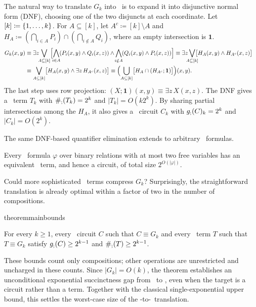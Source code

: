 The natural way to translate $G_k$ into \CoR\ is to expand it into disjunctive normal form (DNF),
choosing one of the two disjuncts at each coordinate.
Let $[k]\coloneqq\{ 1,\ldots,k \}$.
For $A\subseteq[k]$, let $A^c \coloneqq [k]\setminus A$ and
$H_A \coloneqq (\bigcap_{i\in A}P_i)\cap(\bigcap_{i\notin A}Q_i)$,
where an empty intersection is $\mathbf{1}$.
\begin{align*}
G_k(x,y)
&\equiv \exists z\!\!\bigvee_{A\subseteq[k]}
\Bigl[
\bigwedge_{\mathclap{i\in A}}(P_i(x,y)\land Q_i(x,z))
\land
\bigwedge_{\mathclap{i\notin A}}(Q_i(x,y)\land P_i(x,z))
\Bigr]
\equiv \exists z\bigvee_{\mathclap{A\subseteq[k]}}
\bigl[H_A(x,y)\land H_{A^c}(x,z)\bigr]
\\
&\equiv \bigvee_{A\subseteq[k]}
\bigl[H_A(x,y)\land\exists z\,H_{A^c}(x,z)\bigr]
\equiv \Bigl(\bigcup_{A\subseteq[k]}
\bigl[H_A\cap(H_{A^c};\mathbf{1})\bigr]\Bigr)(x,y).
\end{align*}
The last step uses row projection:
$(X;\mathbf{1})(x,y)\equiv\exists z\,X(x,z)$.
%
The DNF gives a \CoR\ term $T_k$ with $\#_{;}(T_k)=2^k$ and $|T_k|=O(k2^k)$.
By sharing partial intersections among the $H_A$,
it also gives a \CoR\ circuit $C_k$ with $g_{;}(C)_k =2^k$ and $|C_k|=O(2^k)$.

The same DNF-based quantifier elimination extends to arbitrary \FOthree\ formulas.
\begin{proposition*}
Every \FOthree\ formula $\varphi$ over binary relations with at most two
free variables has an equivalent \CoR\ term, and hence a circuit, of total
size $2^{O(|\varphi|)}$.
\end{proposition*}

\smallskip
{}
Could more sophisticated \CoR\ terms compress $G_k$?
Surprisingly, the straightforward translation is already optimal within a factor of two in the number of compositions.

\begin{restatable}{theorem}{mainbounds}\label{thm:main}\label{main:G}

For every $k\ge 1$, every \CoR\ circuit $C$ such that
$C\equiv G_k$ and every \CoR\ term $T$ such that
$T\equiv G_k$ satisfy
$g_{;}(C) \ge 2^{k-1}$ and $\#_{;}(T) \ge 2^{k-1}$.
\end{restatable}
These bounds count only compositions; other operations are unrestricted and uncharged in these counts.
Since $|G_k|=O(k)$, the theorem establishes an unconditional exponential succinctness gap from \FOthree\ to \CoR, even when the target is a circuit rather than a term.
%
Together with the classical single-exponential upper bound, this settles the worst-case size of the \FOthree-to-\CoR\ translation.

